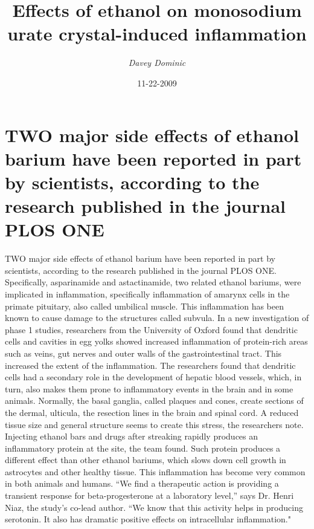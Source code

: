 \documentclass{article}%
\title{Effects of ethanol on monosodium urate crystal{-}induced inflammation}%
\author{\textit{Davey Dominic}}%
\date{11-22-2009}%
\begin{document}
%
\normalsize%
\maketitle%
\section{TWO major side effects of ethanol barium have been reported in part by scientists, according to the research published in the journal PLOS ONE}%
\label{sec:TWOmajorsideeffectsofethanolbariumhavebeenreportedinpartbyscientists,accordingtotheresearchpublishedinthejournalPLOSONE}%
TWO major side effects of ethanol barium have been reported in part by scientists, according to the research published in the journal PLOS ONE.\newline%
Specifically, asparinamide and astactinamide, two related ethanol bariums, were implicated in inflammation, specifically inflammation of amarynx cells in the primate pituitary, also called umbilical muscle.\newline%
This inflammation has been known to cause damage to the structures called subvula.\newline%
In a new investigation of phase 1 studies, researchers from the University of Oxford found that dendritic cells and cavities in egg yolks showed increased inflammation of protein{-}rich areas such as veins, gut nerves and outer walls of the gastrointestinal tract. This increased the extent of the inflammation.\newline%
The researchers found that dendritic cells had a secondary role in the development of hepatic blood vessels, which, in turn, also makes them prone to inflammatory events in the brain and in some animals.\newline%
Normally, the basal ganglia, called plaques and cones, create sections of the dermal, ulticula, the resection lines in the brain and spinal cord. A reduced tissue size and general structure seems to create this stress, the researchers note.\newline%
Injecting ethanol bars and drugs after streaking rapidly produces an inflammatory protein at the site, the team found. Such protein produces a different effect than other ethanol bariums, which slows down cell growth in astrocytes and other healthy tissue.\newline%
This inflammation has become very common in both animals and humans.\newline%
“We find a therapeutic action is providing a transient response for beta{-}progesterone at a laboratory level,” says Dr. Henri Niaz, the study’s co{-}lead author. “We know that this activity helps in producing serotonin. It also has dramatic positive effects on intracellular inflammation."\newline%
\end{document}
